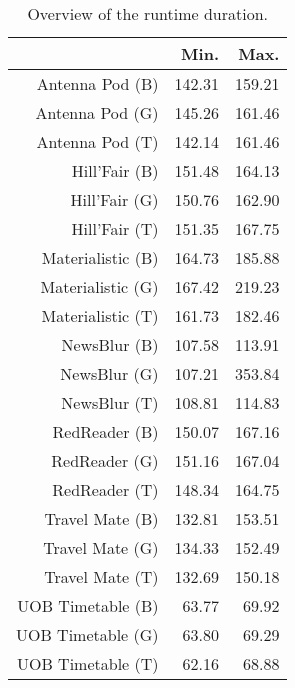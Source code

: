 \begin{table}[ht]
\centering
\begin{tabular}{rrr}
  \hline
 & Min. & Max. \\ 
  \hline
Antenna Pod (B) & 142.31 & 159.21 \\ 
  Antenna Pod (G) & 145.26 & 161.46 \\ 
  Antenna Pod (T) & 142.14 & 161.46 \\ 
  Hill'Fair (B) & 151.48 & 164.13 \\ 
  Hill'Fair (G) & 150.76 & 162.90 \\ 
  Hill'Fair (T) & 151.35 & 167.75 \\ 
  Materialistic (B) & 164.73 & 185.88 \\ 
  Materialistic (G) & 167.42 & 219.23 \\ 
  Materialistic (T) & 161.73 & 182.46 \\ 
  NewsBlur (B) & 107.58 & 113.91 \\ 
  NewsBlur (G) & 107.21 & 353.84 \\ 
  NewsBlur (T) & 108.81 & 114.83 \\ 
  RedReader (B) & 150.07 & 167.16 \\ 
  RedReader (G) & 151.16 & 167.04 \\ 
  RedReader (T) & 148.34 & 164.75 \\ 
  Travel Mate (B) & 132.81 & 153.51 \\ 
  Travel Mate (G) & 134.33 & 152.49 \\ 
  Travel Mate (T) & 132.69 & 150.18 \\ 
  UOB Timetable (B) & 63.77 & 69.92 \\ 
  UOB Timetable (G) & 63.80 & 69.29 \\ 
  UOB Timetable (T) & 62.16 & 68.88 \\ 
   \hline
\end{tabular}
\caption{Overview of the runtime duration.} 
\label{tab:results:rq1:summary:duration}
\end{table}
